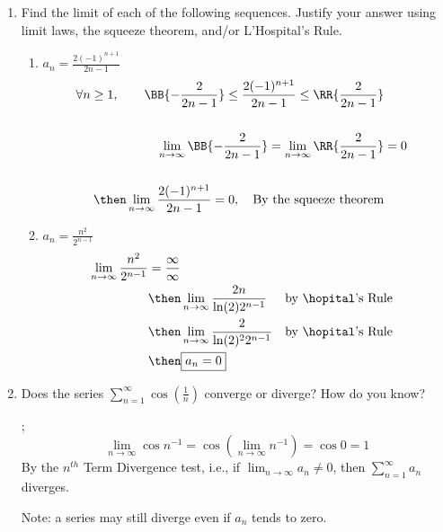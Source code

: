 \documentclass{nosvagor-notes}
\begin{document}
\begin{enumerate}
  \item Find the limit of each of the following sequences. Justify your answer
    using limit laws, the squeeze theorem, and/or L’Hospital’s Rule.
    \begin{enumerate}
      \item \(\displaystyle a_n = \frac{2(-1)^{n+1}}{2n-1}\)
      \begin{align*}
        \forall n \geq 1,
        \qquad \BB{-\frac{2}{2n-1}} \leq
        \frac{2(-1)^{n+1}}{2n-1} \leq
        \RR{\frac{2}{2n-1}} \\\\
        \lim_{n \to \infty} \BB{-\frac{2}{2n-1}} =
        \lim_{n \to \infty} \RR{\frac{2}{2n-1}} &= 0 \\\\
        \then \lim_{n \to \infty} \frac{2(-1)^{n+1}}{2n-1} = 0, \quad \text{By the squeeze theorem} \\
      \end{align*}

    \vspace{90pt}
      \item \(\displaystyle a_n = \frac{n^2}{2^{n-1}}\)
        \begin{align*}
          \lim_{n \to \infty} \frac{n^2}{2^{n-1}} &= \frac{\infty}{\infty} \\
          &\then \lim_{n \to \infty} \frac{2n}{\ln(2)2^{n-1}}
          && \text{by \hopital's Rule} \\
          &\then \lim_{n \to \infty} \frac{2}{\ln(2)^2 2^{n-1}}
          && \text{by \hopital's Rule} \\
          &\then \boxed{a_n = 0}
        \end{align*}
    \end{enumerate}

  \newpage

  \item Does the series \(\displaystyle \sum_{n=1}^{\infty} \cos \left(
    \frac{1}{n} \right) \) converge or diverge? How do you know?

    ;
    \[%
      \lim_{n \to \infty} \cos n^{-1} = \cos \left(\lim_{n \to \infty} n^{-1}\right) = \cos 0 = 1
    \]%
    By the \(n^{th}\) Term Divergence test, i.e., if \(\lim_{n \to \infty} a_n
    \neq 0\), then \(\sum_{n=1}^{\infty} a_n\) diverges.

    Note: a series may still diverge even if \(a_n\) tends to zero.
    \vspace{80pt}


\end{enumerate}
\end{document}
